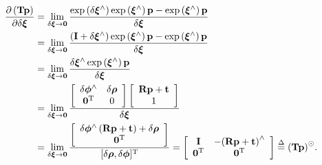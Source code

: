 \begin{align*}
\frac{{\partial \left( \mathbf{Tp} \right)}}{{\partial \delta \boldsymbol{\xi}}} &= \mathop {\lim }\limits_{\delta \boldsymbol{\xi}  \to \mathbf{0}} \frac{{\exp \left( {\delta {\boldsymbol{\xi} ^ \wedge }} \right)\exp \left( {{\boldsymbol{\xi} ^ \wedge }} \right) \mathbf{p} - \exp \left( {{\boldsymbol{\xi} ^ \wedge }} \right) \mathbf{p} }}{{\delta \boldsymbol{\xi} }}\\
&= \mathop {\lim }\limits_{\delta \boldsymbol{\xi}  \to \mathbf{0}} \frac{{\left( { \mathbf{I} + \delta {\boldsymbol{\xi} ^ \wedge }} \right)\exp \left( {{\boldsymbol{\xi} ^ \wedge }} \right) \mathbf{p} - \exp \left( {{\boldsymbol{\xi} ^ \wedge }} \right) \mathbf{p} }}{{\delta {\boldsymbol{\xi} }}}\\
&= \mathop {\lim }\limits_{\delta \boldsymbol{\xi}  \to \mathbf{0}} \frac{{\delta {\boldsymbol{\xi} ^ \wedge }\exp \left( {{\boldsymbol{\xi} ^ \wedge }} \right) \mathbf{p}}}{{\delta {\boldsymbol{\xi} }}}\\
&= \mathop {\lim }\limits_{\delta \boldsymbol{\xi}  \to \mathbf{0}} 
\frac{{\left[ {\begin{array}{*{20}{c}}
                {\delta { \boldsymbol{\phi} ^ \wedge }}&{\delta {\boldsymbol{\rho} }}\\
                {{\mathbf{0}^\mathrm{T}}}&0
        \end{array}} \right]\left[ {\begin{array}{*{20}{c}}
                {\mathbf{Rp} + \mathbf{t}}\\
                1
        \end{array}} \right]}}{{\delta {\boldsymbol{\xi} }}}\\
&= \mathop {\lim }\limits_{\delta \boldsymbol{\xi}  \to \mathbf{0}} \frac{{\left[ {\begin{array}{*{20}{c}}
                {\delta {\boldsymbol{\phi} ^ \wedge }\left( {\mathbf{Rp} + \mathbf{t}} \right) + \delta {\boldsymbol{\rho} }}\\
                \mathbf{0}^\mathrm{T}
        \end{array}} \right]}}{[\delta\boldsymbol{\rho},\delta \boldsymbol{\phi}]^\mathrm{T}} = \left[ {\begin{array}{*{20}{c}}
        \mathbf{I} & { - {{\left( {\mathbf{Rp} + \mathbf{t}} \right)}^ \wedge }} \\
        {{\mathbf{0}}}^\mathrm{T} & \mathbf{0}^\mathrm{T}
\end{array}} \right] \buildrel \Delta \over = {\left( \mathbf{Tp} \right)^ \odot }.
\end{align*}

